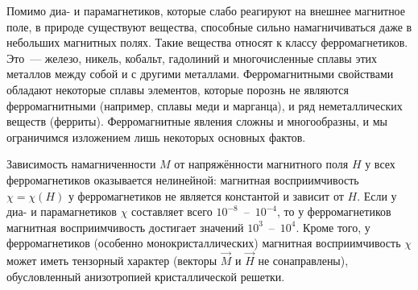 Помимо диа- и парамагнетиков, которые слабо реагируют на внешнее магнитное поле,
в природе существуют вещества, способные сильно намагничиваться даже в небольших
магнитных полях. Такие вещества относят к классу ферромагнетиков. Это~---
железо, никель, кобальт, гадолиний и многочисленные сплавы этих металлов между
собой и с другими металлами. Ферромагнитными свойствами обладают некоторые
сплавы элементов, которые порознь не являются ферромагнитными (например, сплавы
меди и марганца), и ряд неметаллических веществ (ферриты). Ферромагнитные явления
сложны и многообразны, и мы ограничимся изложением лишь некоторых основных фактов.

Зависимость намагниченности $M$ от напряжённости магнитного поля $H$ у всех
ферромагнетиков оказывается нелинейной: магнитная восприимчивость
$\chi=\chi(H)$ у ферромагнетиков не является константой и зависит от $H$.
Если у диа- и парамагнетиков $\chi$ составляет всего $10^{-8}$~--~$10^{-4}$, то у
ферромагнетиков магнитная восприимчивость достигает значений $10^3$~--~$10^4$.
Кроме того, у ферромагнетиков (особенно монокристаллических)
магнитная восприимчивость $\chi$ может иметь тензорный характер
(векторы $\vec{M}$ и $\vec{H}$ не сонаправлены),
обусловленный анизотропией кристаллической решетки.

%
%
%

